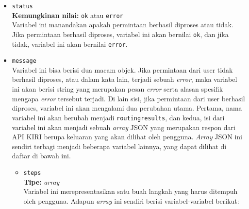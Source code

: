 \documentclass[a4paper,twoside]{article}
\begin{document}
\begin{enumerate}
\begin{itemize}
	\item \verb|status|\\
	\textbf{Kemungkinan nilai:} \verb|ok| atau \verb|error|\\
	Variabel ini manandakan apakah permintaan berhasil diproses atau tidak. Jika permintaan berhasil diproses, variabel ini akan bernilai \verb|ok|, dan jika tidak, variabel ini akan bernilai \verb|error|.
	\item \verb|message|\\
	Variabel ini bisa berisi dua macam objek. Jika permintaan dari user tidak berhasil diproses, atau dalam kata lain, terjadi sebuah \textit{error}, maka variabel ini akan berisi string yang merupakan pesan \textit{error} serta alasan spesifik mengapa \textit{error} tersebut terjadi. Di lain sisi, jika permintaan dari user berhasil diproses, variabel ini akan mengalami dua perubahan utama. Pertama, nama variabel ini akan berubah menjadi \verb|routingresults|, dan kedua, isi dari variabel ini akan menjadi sebuah \textit{array} JSON yang merupakan respon dari API KIRI berupa keluaran yang akan dilihat oleh pengguna. \textit{Array} JSON ini sendiri terbagi menjadi beberapa variabel lainnya, yang dapat dilihat di daftar di bawah ini.
	
	\begin{itemize}
		\item \verb|steps|\\
		\textbf{Tipe:} \textit{array}\\
		Variabel ini merepresentasikan satu buah langkah yang harus ditempuh oleh pengguna. Adapun \textit{array} ini sendiri berisi variabel-variabel berikut:
		

\end{itemize}
\end{itemize}
\end{enumerate}
\end{document}
